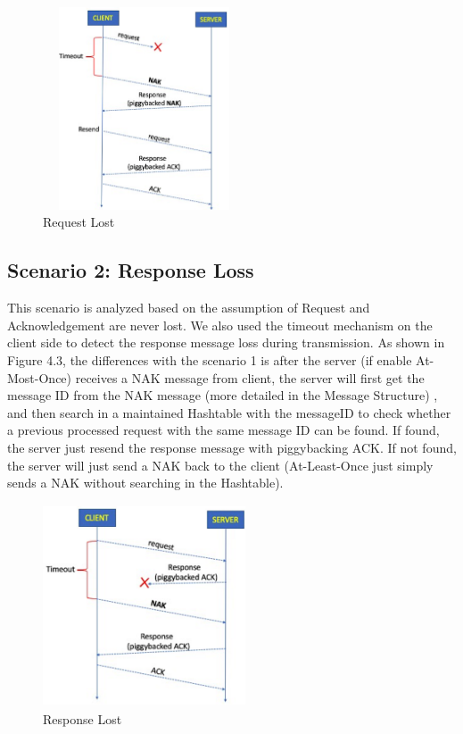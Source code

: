 \begin{spacing}{1}
\begin{figure}[h!]
\centering
  \includegraphics[width=6cm, height=6cm]{Image/2.png}
  \caption{Request Lost}
\end{figure}


\subsection{Scenario 2: Response Loss}
This scenario is analyzed based on the assumption of Request and Acknowledgement are never lost.
We also used the timeout mechanism on the client side to detect the response message loss during transmission. As shown in Figure 4.3, the differences with the scenario 1 is after the server (if enable At-Most-Once) receives a NAK message from client, the server will first get the message ID from the NAK message (more detailed in the Message Structure) , and then search in a maintained Hashtable with the messageID to check whether a previous processed request with the same message ID can be found.
If found, the server just resend the response message with piggybacking ACK. If not found, the server will just send a NAK back to the client (At-Least-Once just simply sends a NAK without searching in the Hashtable).


\begin{figure}[h!]
\centering
  \includegraphics[width=6cm, height=6cm]{Image/1.png}
  \caption{Response Lost}
\end{figure}



\end{spacing}
